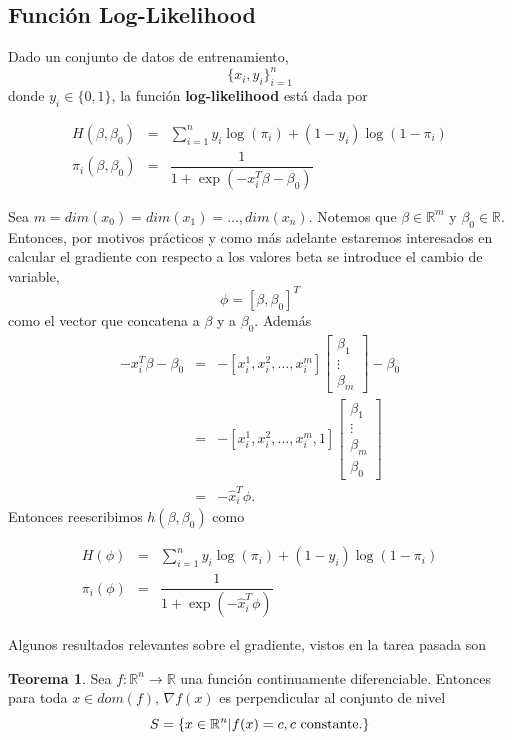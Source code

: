\documentclass[11pt,letterpaper]{article}
\theoremstyle{definition}
\theoremstyle{definition}
\newtheorem{teo}{Teorema}[section]%
\theoremstyle{definition}
\begin{document}
\subsection{Función Log-Likelihood}
Dado un conjunto de datos de entrenamiento, 
\[\{x_i, y_i\}_{i = 1}^n\]
donde $ y_i \in \{ 0,1 \} $, la función \textbf{log-likelihood} está dada por
\begin{shaded*}
\begin{eqnarray*}
	H ( \beta, \beta_0) & = & \sum_{i = 1}^n y_i \log(\pi_i) + ( 1 - y_i) \log(1-\pi_i) \\
	\pi_i (\beta, \beta_0) & = & \dfrac{1}{1 + \exp (-x_i^T \beta - \beta_0)}
\end{eqnarray*}
\end{shaded*}
Sea $ m = dim(x_0) = dim(x_1) = \dots, dim(x_n) $. Notemos que $ \beta \in\mathbb{R}^m $ y $ \beta_0 \in \mathbb{R} $. Entonces, por motivos prácticos y como más adelante estaremos interesados en calcular el gradiente con respecto a los valores beta se introduce el cambio de variable,
\begin{equation}
	\phi = [\beta, \beta_0]^T
\end{equation}
como el vector que concatena a $ \beta $ y a $ \beta_0 $. Además
\begin{eqnarray*}
	- x_i^T \beta - \beta_0 & = &- \left[x_i^1, x_i^2, \dots, x_i^m \right] 
								\left[\begin{matrix}
									\beta_1 \\
									\vdots \\
									\beta_m
								\end{matrix}\right] - \beta_0 \\
							& = & - \left[x_i^1, x_i^2, \dots, x_i^m, 1 \right] 
								\left[\begin{matrix}
									\beta_1 \\
									\vdots \\
									\beta_m \\
									\beta_0
								\end{matrix}\right] \\
							& = & - \hat{x}_i^T \phi.
\end{eqnarray*}
Entonces reescribimos $ h(\beta, \beta_0) $ como 
\begin{shaded*}
	\begin{eqnarray*}
		H ( \phi) & = & \sum_{i = 1}^n y_i \log(\pi_i) + ( 1 - y_i) \log(1-\pi_i) \\
		\pi_i (\phi) & = & \dfrac{1}{1 + \exp (-\hat{x}_i^T \phi)}
	\end{eqnarray*}
\end{shaded*}
Algunos resultados relevantes sobre el gradiente, vistos en la tarea pasada son
\begin{shaded*}
\begin{teo}
	Sea $ f: \mathbb{R}^n \to \mathbb{R} $ una función continuamente diferenciable. Entonces para toda $ x  \in dom(f) $, $ \nabla f(x) $ es perpendicular al conjunto de nivel
	\[ S = \{ x \in \mathbb{R}^n | f(x) = c, c\textup{ constante.} \} \]
\end{teo}
\end{shaded*}
\end{document}
